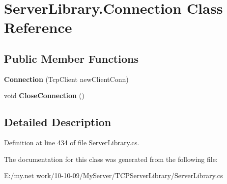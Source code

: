 \hypertarget{class_server_library_1_1_connection}{
\section{ServerLibrary.Connection Class Reference}
\label{class_server_library_1_1_connection}
}
\subsection*{Public Member Functions}
\begin{DoxyCompactItemize}
\item 
\hypertarget{class_server_library_1_1_connection_a0468838cdaae95012c75a0a2992dbce4}{
{\bfseries Connection} (TcpClient newClientConn)}
\label{class_server_library_1_1_connection_a0468838cdaae95012c75a0a2992dbce4}

\item 
\hypertarget{class_server_library_1_1_connection_af3d8a76a88a6ced7d799ace3d91459c2}{
void {\bfseries CloseConnection} ()}
\label{class_server_library_1_1_connection_af3d8a76a88a6ced7d799ace3d91459c2}

\end{DoxyCompactItemize}


\subsection{Detailed Description}


Definition at line 434 of file ServerLibrary.cs.

The documentation for this class was generated from the following file:\begin{DoxyCompactItemize}
\item 
E:/my.net work/10-\/10-\/09/MyServer/TCPServerLibrary/ServerLibrary.cs\end{DoxyCompactItemize}
